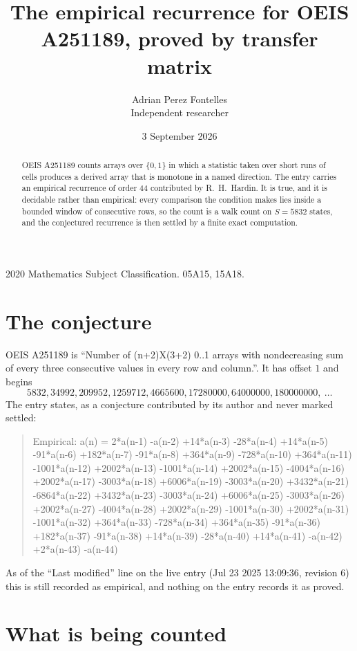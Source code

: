 \documentclass[11pt,a4paper]{article}
\title{The empirical recurrence for OEIS A251189, proved by transfer matrix}
\author{Adrian Perez Fontelles\\ \small Independent researcher}
\date{3 September 2026}
\theoremstyle{plain}
\theoremstyle{definition}
\begin{document}
\maketitle

\begin{abstract}
OEIS A251189 counts arrays over $\{0,1\}$ in which a statistic taken over short runs
of cells produces a derived array that is monotone in a named direction. The entry carries an
empirical recurrence of order $44$ contributed by R.~H.~Hardin. It is true, and it is
decidable rather than empirical: every comparison the condition makes lies inside a bounded
window of consecutive rows, so the count is a walk count on $S=5832$ states, and the
conjectured recurrence is then settled by a finite exact computation.
\end{abstract}

\noindent\small 2020 Mathematics Subject Classification. 05A15, 15A18.\normalsize

\section{The conjecture}

OEIS A251189 is ``Number of (n+2)X(3+2) 0..1 arrays with nondecreasing sum of every three consecutive values in every row and column.''. It has offset $1$ and begins
\[
5832, 34992, 209952, 1259712, 4665600, 17280000, 64000000, 180000000,\ \dots
\]
The entry states, as a conjecture contributed by its author and never marked settled:
\begin{quote}
Empirical: a(n) = 2*a(n-1) -a(n-2) +14*a(n-3) -28*a(n-4) +14*a(n-5) -91*a(n-6) +182*a(n-7) -91*a(n-8) +364*a(n-9) -728*a(n-10) +364*a(n-11) -1001*a(n-12) +2002*a(n-13) -1001*a(n-14) +2002*a(n-15) -4004*a(n-16) +2002*a(n-17) -3003*a(n-18) +6006*a(n-19) -3003*a(n-20) +3432*a(n-21) -6864*a(n-22) +3432*a(n-23) -3003*a(n-24) +6006*a(n-25) -3003*a(n-26) +2002*a(n-27) -4004*a(n-28) +2002*a(n-29) -1001*a(n-30) +2002*a(n-31) -1001*a(n-32) +364*a(n-33) -728*a(n-34) +364*a(n-35) -91*a(n-36) +182*a(n-37) -91*a(n-38) +14*a(n-39) -28*a(n-40) +14*a(n-41) -a(n-42) +2*a(n-43) -a(n-44)
\end{quote}
As of the ``Last modified'' line on the live entry (Jul 23 2025 13:09:36, revision 6) this is still
recorded as empirical, and nothing on the entry records it as proved.

\section{What is being counted}
\end{document}

